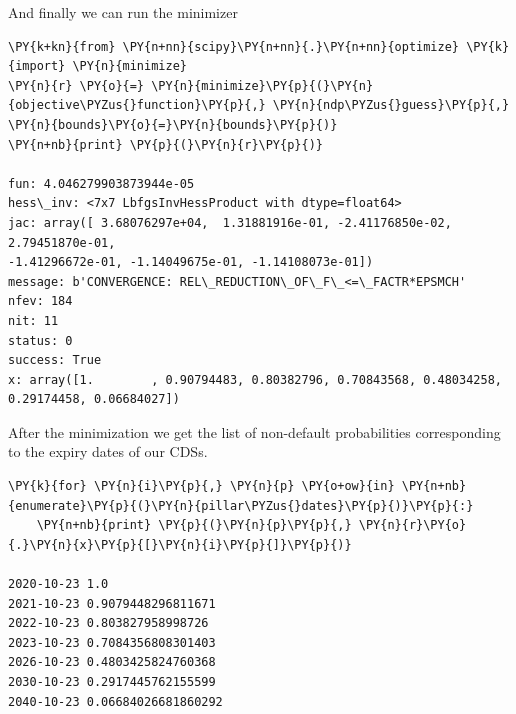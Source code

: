And finally we can run the minimizer
\begin{tcolorbox}[breakable, size=fbox, boxrule=1pt, pad at break*=1mm,colback=cellbackground, colframe=cellborder]
\begin{Verbatim}[commandchars=\\\{\}]
\PY{k+kn}{from} \PY{n+nn}{scipy}\PY{n+nn}{.}\PY{n+nn}{optimize} \PY{k}{import} \PY{n}{minimize}
\PY{n}{r} \PY{o}{=} \PY{n}{minimize}\PY{p}{(}\PY{n}{objective\PYZus{}function}\PY{p}{,} \PY{n}{ndp\PYZus{}guess}\PY{p}{,} \PY{n}{bounds}\PY{o}{=}\PY{n}{bounds}\PY{p}{)}
\PY{n+nb}{print} \PY{p}{(}\PY{n}{r}\PY{p}{)}

fun: 4.046279903873944e-05
hess\_inv: <7x7 LbfgsInvHessProduct with dtype=float64>
jac: array([ 3.68076297e+04,  1.31881916e-01, -2.41176850e-02,
2.79451870e-01,
-1.41296672e-01, -1.14049675e-01, -1.14108073e-01])
message: b'CONVERGENCE: REL\_REDUCTION\_OF\_F\_<=\_FACTR*EPSMCH'
nfev: 184
nit: 11
status: 0
success: True
x: array([1.        , 0.90794483, 0.80382796, 0.70843568, 0.48034258,
0.29174458, 0.06684027])
\end{Verbatim}
\end{tcolorbox}

After the minimization we get the list of non-default probabilities corresponding to the expiry dates of our CDSs.

\begin{tcolorbox}[breakable, size=fbox, boxrule=1pt, pad at break*=1mm,colback=cellbackground, colframe=cellborder]
\begin{Verbatim}[commandchars=\\\{\}]
\PY{k}{for} \PY{n}{i}\PY{p}{,} \PY{n}{p} \PY{o+ow}{in} \PY{n+nb}{enumerate}\PY{p}{(}\PY{n}{pillar\PYZus{}dates}\PY{p}{)}\PY{p}{:}
    \PY{n+nb}{print} \PY{p}{(}\PY{n}{p}\PY{p}{,} \PY{n}{r}\PY{o}{.}\PY{n}{x}\PY{p}{[}\PY{n}{i}\PY{p}{]}\PY{p}{)}

2020-10-23 1.0
2021-10-23 0.9079448296811671
2022-10-23 0.803827958998726
2023-10-23 0.7084356808301403
2026-10-23 0.4803425824760368
2030-10-23 0.2917445762155599
2040-10-23 0.06684026681860292
\end{Verbatim}
\end{tcolorbox}

